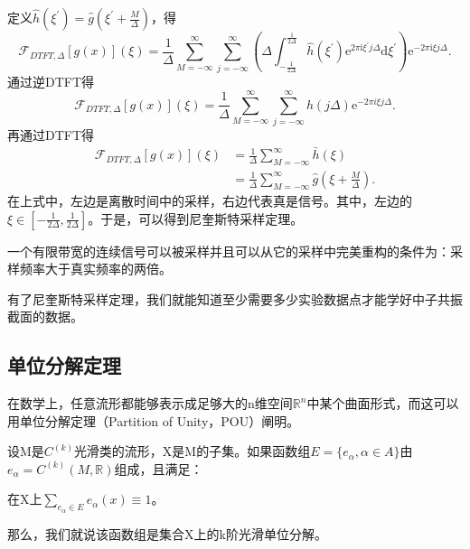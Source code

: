 定义$\hat{h}\left(\xi^{\prime}\right)=\hat{g}\left(\xi^{\prime}+\frac{M}{\Delta}\right)$，得
\begin{equation}
\mathcal{F}_{D T F T, \Delta}[g(x)](\xi)=\frac{1}{\Delta} \sum_{M=-\infty}^{\infty} \sum_{j=-\infty}^{\infty}\left(\Delta \int_{-\frac{1}{2 \Delta}}^{\frac{1}{2 \Delta}} \hat{h}\left(\xi^{\prime}\right) \mathrm{e}^{2 \pi \mathrm{i} \xi^{\prime} j \Delta} \mathrm{d} \xi^{\prime}\right) \mathrm{e}^{-2 \pi \mathrm{i} \xi j \Delta} .
\end{equation}
通过逆DTFT得
\begin{equation}
    \mathcal{F}_{DTFT,\Delta}[g(x)](\xi)=\dfrac{1}{\Delta}\sum\limits_{M=-\infty}^\infty\sum\limits_{j=-\infty}^\infty h(j\Delta)\mathrm{e}^{-2\pi i\xi j\Delta}.
\end{equation}
再通过DTFT得
\begin{equation}
    \begin{aligned}\mathcal{F}_{DTFT,\Delta}[g(x)](\xi)&=\frac{1}{\Delta}\sum_{M=-\infty}^\infty\bar{h}(\xi)\\ &=\frac{1}{\Delta}\sum_{M=-\infty}^\infty\hat{g}(\xi+\frac{M}{\Delta}).\end{aligned}
\end{equation}
在上式中，左边是离散时间中的采样，右边代表真是信号。其中，左边的$\xi \in [-\frac{1}{2\Delta },\frac{1}{2\Delta }  ]$。于是，可以得到尼奎斯特采样定理\cite{benedetto2001modern}。

\begin{thm}
一个有限带宽的连续信号可以被采样并且可以从它的采样中完美重构的条件为：采样频率大于真实频率的两倍。
\end{thm}

有了尼奎斯特采样定理，我们就能知道至少需要多少实验数据点才能学好中子共振截面的数据。

\subsection{单位分解定理}
在数学上，任意流形都能够表示成足够大的n维空间$\mathbb{R}^n$中某个曲面形式，而这可以用单位分解定理（Partition of Unity，POU）\cite{卓里奇2019数学分析}阐明。

\begin{thm}
设M是$C^{(k)}$光滑类的流形，X是M的子集。如果函数组$E= \{e_{\alpha},\alpha \in A\}$由$e_{\alpha} = C^{(k)}(M,\mathbb{R})$组成，且满足：

在X上$\sum_{e_{\alpha }\in E}^{}e_{\alpha }(x)\equiv 1 $。

那么，我们就说该函数组是集合X上的k阶光滑单位分解。
\end{thm}

